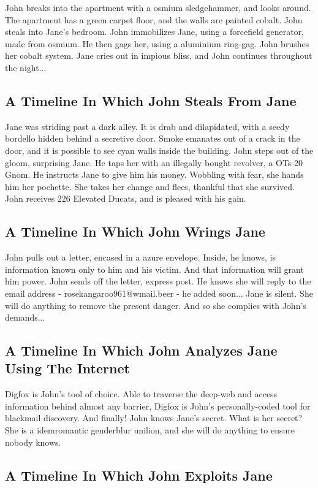 \documentclass{article}
\begin{document}
John breaks into the apartment with a osmium sledgehammer, and looks around.
The apartment has a green carpet floor, and the walls are painted cobalt.
John steals into Jane's bedroom.
John immobilizes Jane, using a forcefield generator, made from osmium.
He then gags her, using a aluminium ring{-}gag.
John brushes her cobalt system.
Jane cries out in impious bliss, and John continues throughout the night...
\subsection{A Timeline In Which John Steals From Jane}


Jane was striding past a dark alley.
It is drab and dilapidated, with a seedy bordello hidden behind a secretive door.
Smoke emanates out of a crack in the door, and it is possible to see cyan walls inside the building.
John steps out of the gloom, surprising Jane.
He taps her with an illegally bought revolver, a OTs{-}20 Gnom.
He instructs Jane to give him his money.
Wobbling with fear, she hands him her pochette.
She takes her change and flees, thankful that she survived.
John receives 226 Elevated Ducats, and is pleased with his gain.
\subsection{A Timeline In Which John Wrings Jane}


John pulls out a letter, encased in a azure envelope. Inside, he knows, is information known only to him and his victim. And that information will grant him power.
John sends off the letter, express post. He knows she will reply to the email address {-} rosekangaroo961@wmail.beer {-} he added soon...
Jane is silent. She will do anything to remove the present danger. And so she complies with John's demands...
\subsection{A Timeline In Which John Analyzes Jane Using The Internet}


Digfox is John's tool of choice. Able to traverse the deep{-}web and access information behind almost any barrier, Digfox is John's personally{-}coded tool for blackmail discovery.
And finally!
John knows Jane's secret. What is her secret? She is a idemromantic genderblur unilion, and she will do anything to ensure nobody knows.
\subsection{A Timeline In Which John Exploits Jane}
\end{document}
